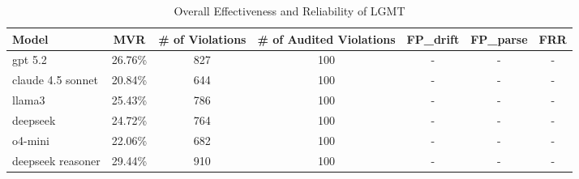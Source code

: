\begin{table}[pos=htbp]
\centering
\caption{Overall Effectiveness and Reliability of LGMT}\label{tab:rq1}
\begin{tabular}{lcccccc}
\toprule
Model & MVR & \# of Violations & \# of Audited Violations & FP\_drift & FP\_parse & FRR \\
\midrule
gpt 5.2 & 26.76\% & 827 & 100 & - & - & - \\
claude 4.5 sonnet & 20.84\% & 644 & 100 & - & - & - \\
llama3 & 25.43\% & 786 & 100 & - & - & - \\
deepseek & 24.72\% & 764 & 100 & - & - & - \\
o4-mini & 22.06\% & 682 & 100 & - & - & - \\
deepseek reasoner & 29.44\% & 910 & 100 & - & - & - \\
\bottomrule
\end{tabular}
\end{table}